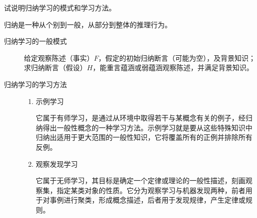 \begin{question}
试说明归纳学习的模式和学习方法。
\end{question}
\begin{solution}
归纳是一种从个别到一般，从部分到整体的推理行为。
	\begin{description}
		\item[归纳学习的一般模式] 给定观察陈述（事实）$F$，假定的初始归纳断言（可能为空），及背景知识；求归纳断言（假设）$H$，能重言蕴涵或弱蕴涵观察陈述，并满足背景知识。 
		\item[归纳学习的学习方法] \quad
			\begin{enumerate}
				\item 示例学习 \par
				它属于有师学习，是通过从环境中取得若干与某概念有关的例子，经归纳得出一般性概念的一种学习方法。示例学习就是要从这些特殊知识中归纳出适用于更大范围的一般性知识，它将覆盖所有的正例并排除所有反例。
				\item 观察发现学习 \par
				它属于无师学习，其目标是确定一个定律或理论的一般性描述，刻画观察集，指定某类对象的性质。它分为观察学习与机器发现两种，前者用于对事例进行聚类，形成概念描述，后者用于发现规律，产生定律或规则。 
			\end{enumerate}
	\end{description}
\end{solution}

